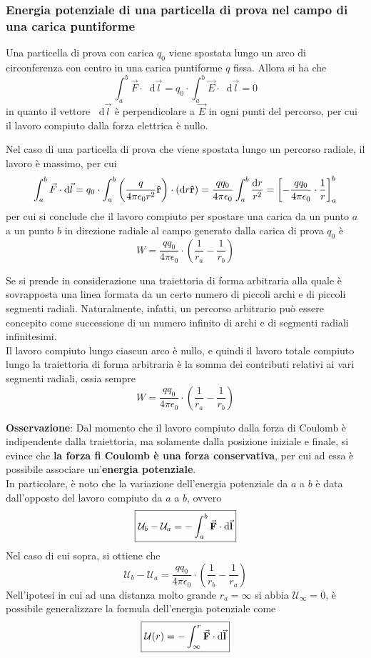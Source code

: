 \documentclass[a4paper]{extarticle}
\newcommand\dif{\mathop{}\!\mathrm{d}}
\begin{document}
\subsubsection{Energia potenziale di una particella di prova nel campo di una carica puntiforme}
Una particella di prova con carica $q_0$ viene spostata lungo un arco di circonferenza con centro in una carica puntiforme $q$ fissa. Allora si ha che
\[\int_a^b \vec{F} \cdot \dif \vec l = q_0 \cdot \int_a^b \vec E \cdot \dif \vec l = 0\]
in quanto il vettore $\dif \vec l$ è perpendicolare a $\vec E$ in ogni punti del percorso, per cui il lavoro compiuto dalla forza elettrica è nullo.

\vspace{2em}
\noindent
Nel caso di una particella di prova che viene spostata lungo un percorso radiale, il lavoro è massimo, per cui
\[\int_a^b \vec F \cdot \dif \vec l = q_0 \cdot \int_a^b \left(\frac{q}{4 \pi \epsilon_0 r^2} \bf{\hat r}\right) \cdot \left(\dif r \bf{\hat r}\right) = \frac{qq_0}{4 \pi \epsilon_0} \int_a^b \frac{\dif r}{r^2} = \left[-\frac{qq_0}{4 \pi \epsilon_0} \cdot \frac{1}{r}\right]_a^b\]
per cui si conclude che il lavoro compiuto per spostare una carica da un punto $a$ a un punto $b$ in direzione radiale al campo generato dalla carica di prova $q_0$ è
\[\boxed{W=\frac{qq_0}{4 \pi \epsilon_0} \cdot \left(\frac{1}{r_a} - \frac{1}{r_b}\right)}\]

\vspace{2em}
\noindent
Se si prende in considerazione una traiettoria di forma arbitraria alla quale è sovrapposta una linea formata da un certo numero di piccoli archi e di piccoli segmenti radiali. Naturalmente, infatti, un percorso arbitrario può essere concepito come successione di un numero infinito di archi e di segmenti radiali infinitesimi.\\
Il lavoro compiuto lungo ciascun arco è nullo, e quindi il lavoro totale compiuto lungo la traiettoria di forma arbitraria è la somma dei contributi relativi ai vari segmenti radiali, ossia sempre
\[\boxed{W=\frac{qq_0}{4 \pi \epsilon_0} \cdot \left(\frac{1}{r_a} - \frac{1}{r_b}\right)}\]

\vspace{1em}
\noindent
\textbf{Osservazione}: Dal momento che il lavoro compiuto dalla forza di Coulomb è indipendente dalla traiettoria, ma solamente dalla posizione iniziale e finale, si evince che \textbf{la forza fi Coulomb è una forza conservativa}, per cui ad essa è possibile associare un'\textbf{energia potenziale}.\\
In particolare, è noto che la variazione dell'energia potenziale da $a$ a $b$ è data dall'opposto del lavoro compiuto da $a$ a $b$, ovvero
\[\boxed{\mathcal{U}_b-\mathcal{U}_a=-\int_a^b \va{F} \cdot \dif \va{l}}\]
Nel caso di cui sopra, si ottiene che
\[\mathcal{U}_b-\mathcal{U}_a = \frac{qq_0}{4 \pi \epsilon_0} \cdot \left(\frac{1}{r_b} - \frac{1}{r_a}\right)\]
Nell'ipotesi in cui ad una distanza molto grande $r_a=\infty$ si abbia $\mathcal{U}_\infty=0$, è possibile generalizzare la formula dell'energia potenziale come
\[\boxed{\mathcal{U}(r)=-\int_{\infty}^r \va{F} \cdot \dif \va{l}}\]
\end{document}
